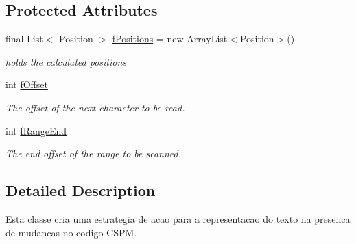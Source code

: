 \subsection*{Protected Attributes}
\begin{DoxyCompactItemize}
\item 
\mbox{\label{classcom_1_1fware_1_1cspdt_1_1cspm_1_1editor_1_1config_1_1_csp_m_reconciling_strategy_a32d28514e5f49b442eb48dfa3657abae}} 
final List$<$ Position $>$ \hyperlink{classcom_1_1fware_1_1cspdt_1_1cspm_1_1editor_1_1config_1_1_csp_m_reconciling_strategy_a32d28514e5f49b442eb48dfa3657abae}{f\+Positions} = new Array\+List$<$Position$>$()
\begin{DoxyCompactList}\small\item\em holds the calculated positions \end{DoxyCompactList}\item 
\mbox{\label{classcom_1_1fware_1_1cspdt_1_1cspm_1_1editor_1_1config_1_1_csp_m_reconciling_strategy_afa451850691ae557a816cc5bd5d76d1a}} 
int \hyperlink{classcom_1_1fware_1_1cspdt_1_1cspm_1_1editor_1_1config_1_1_csp_m_reconciling_strategy_afa451850691ae557a816cc5bd5d76d1a}{f\+Offset}
\begin{DoxyCompactList}\small\item\em The offset of the next character to be read. \end{DoxyCompactList}\item 
\mbox{\label{classcom_1_1fware_1_1cspdt_1_1cspm_1_1editor_1_1config_1_1_csp_m_reconciling_strategy_af52adef988902c51cc4054d2ad46911a}} 
int \hyperlink{classcom_1_1fware_1_1cspdt_1_1cspm_1_1editor_1_1config_1_1_csp_m_reconciling_strategy_af52adef988902c51cc4054d2ad46911a}{f\+Range\+End}
\begin{DoxyCompactList}\small\item\em The end offset of the range to be scanned. \end{DoxyCompactList}\end{DoxyCompactItemize}


\subsection{Detailed Description}
Esta classe cria uma estrategia de acao para a representacao do texto na presenca de mudancas no codigo C\+S\+PM. 

